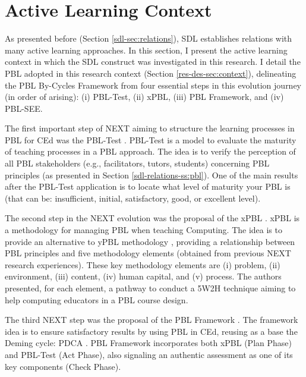 \section{Active Learning Context}
\label{res-des-sec:active-learning}

As presented before (Section \ref{sdl-sec:relations}), \gls{SDL} establishes relations with many active learning approaches. In this section, I present the active learning context in which the \gls{SDL} construct was investigated in this research. I detail the \gls{PBL} adopted in this research context (Section \ref{res-des-sec:context}), delineating the \gls{PBL} By-Cycles Framework \cite{alexandre:2018} from four essential steps in this evolution journey (in order of arising): (i) \gls{PBL}-Test, (ii) \gls{xPBL}, (iii) \gls{PBL} Framework, and (iv) \gls{PBL-SEE}.

The first important step of \gls{NEXT} aiming to structure the learning processes in \gls{PBL} for \gls{CEd} was the \gls{PBL}-Test \cite{santos:2013}. \gls{PBL}-Test is a model to evaluate the maturity of
teaching processes in a \gls{PBL} approach. The idea is to verify the perception of all \gls{PBL} stakeholders (e.g., facilitators, tutors, students) concerning \gls{PBL} principles (as presented in Section \ref{sdl-relations-ss:pbl}). One of the main results after the \gls{PBL}-Test application is to locate what level of maturity your \gls{PBL} is (that can be: insufficient, initial, satisfactory, good, or excellent level).

The second step in the \gls{NEXT} evolution was the proposal of the \gls{xPBL} \cite{santos:2014}. \gls{xPBL} is a methodology for managing \gls{PBL} when teaching Computing. The idea is to provide an alternative to yPBL methodology \cite{exposito:2010}, providing a relationship between \gls{PBL} principles and five methodology elements (obtained from previous \gls{NEXT} research experiences). These key methodology elements are (i) problem, (ii) environment, (iii) content, (iv) human capital, and (v) process. The authors presented, for each element, a pathway to conduct a 5W2H technique \cite{klock:2016} aiming to help computing educators in a \gls{PBL} course design.

The third \gls{NEXT} step was the proposal of the \gls{PBL} Framework \cite{rodrigues:2016}. The framework idea is to ensure satisfactory results by using \gls{PBL} in \gls{CEd}, reusing as a base the Deming cycle: \gls{PDCA} \cite{dudin:2015}. \gls{PBL} Framework incorporates both \gls{xPBL} (Plan Phase) and \gls{PBL}-Test (Act Phase), also signaling an authentic assessment as one of its key components (Check Phase).

